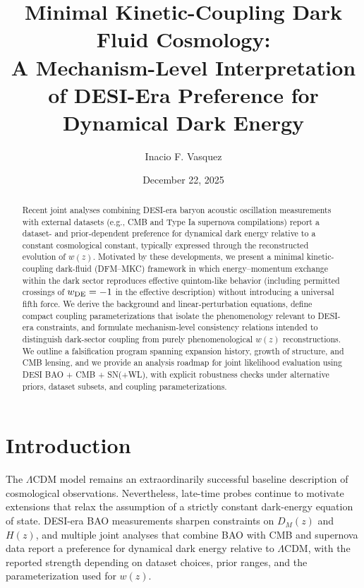 \documentclass[11pt]{article}
\newcommand{\LCDM}{\ensuremath{\Lambda\mathrm{CDM}}\xspace}
\newcommand{\wde}{\ensuremath{w_{\rm DE}}\xspace}
\newcommand{\wz}{\ensuremath{w(z)}\xspace}
\begin{document}
\title{Minimal Kinetic-Coupling Dark Fluid Cosmology:\\
A Mechanism-Level Interpretation of DESI-Era Preference for Dynamical Dark Energy}

\author{Inacio F. Vasquez}

\date{December 22, 2025}

\begin{abstract}
Recent joint analyses combining DESI-era baryon acoustic oscillation measurements with external datasets
(e.g., CMB and Type Ia supernova compilations) report a dataset- and prior-dependent preference for
dynamical dark energy relative to a constant cosmological constant, typically expressed through the reconstructed evolution of \wz.
Motivated by these developments, we present a minimal kinetic-coupling dark-fluid (DFM--MKC) framework in which
energy--momentum exchange within the dark sector reproduces effective quintom-like behavior (including permitted crossings of $\wde=-1$ in the effective description)
without introducing a universal fifth force.
We derive the background and linear-perturbation equations, define compact coupling parameterizations that isolate the phenomenology relevant to DESI-era constraints,
and formulate mechanism-level consistency relations intended to distinguish dark-sector coupling from purely phenomenological \wz reconstructions.
We outline a falsification program spanning expansion history, growth of structure, and CMB lensing, and we provide an analysis roadmap for joint likelihood evaluation using DESI BAO + CMB + SN(+WL),
with explicit robustness checks under alternative priors, dataset subsets, and coupling parameterizations.
\end{abstract}

\maketitle

\section{Introduction}
\label{sec:intro}

The \LCDM model remains an extraordinarily successful baseline description of cosmological observations.
Nevertheless, late-time probes continue to motivate extensions that relax the assumption of a strictly constant dark-energy equation of state.
DESI-era BAO measurements sharpen constraints on $D_M(z)$ and $H(z)$, and multiple joint analyses that combine BAO with CMB and supernova data report a preference for dynamical dark energy relative to \LCDM,
with the reported strength depending on dataset choices, prior ranges, and the parameterization used for \wz.
\end{document}
